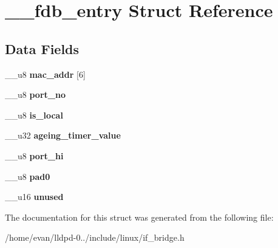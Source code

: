 \section{\-\_\-\-\_\-fdb\-\_\-entry \-Struct \-Reference}
\label{struct____fdb__entry}
\subsection*{\-Data \-Fields}
\begin{DoxyCompactItemize}
\item 
\-\_\-\-\_\-u8 {\bfseries mac\-\_\-addr} [6]\label{struct____fdb__entry_ac4e40081abfae94ec7a8e9538a264cf0}

\item 
\-\_\-\-\_\-u8 {\bfseries port\-\_\-no}\label{struct____fdb__entry_a6b64f21a6112a768e998f308e4888ead}

\item 
\-\_\-\-\_\-u8 {\bfseries is\-\_\-local}\label{struct____fdb__entry_a09a0985acc007c17f9c35a5e5431e89a}

\item 
\-\_\-\-\_\-u32 {\bfseries ageing\-\_\-timer\-\_\-value}\label{struct____fdb__entry_aaa4575c3a3a9eb92362ba65b1d244339}

\item 
\-\_\-\-\_\-u8 {\bfseries port\-\_\-hi}\label{struct____fdb__entry_acb969908a073fdf8ab30d96bee84834c}

\item 
\-\_\-\-\_\-u8 {\bfseries pad0}\label{struct____fdb__entry_a58a16eeb0a302f46f5d78a9031176304}

\item 
\-\_\-\-\_\-u16 {\bfseries unused}\label{struct____fdb__entry_a93da0036ebf96debca4a2d827735f5cc}

\end{DoxyCompactItemize}


\-The documentation for this struct was generated from the following file\-:\begin{DoxyCompactItemize}
\item 
/home/evan/lldpd-\/0../include/linux/if\-\_\-bridge.\-h\end{DoxyCompactItemize}
